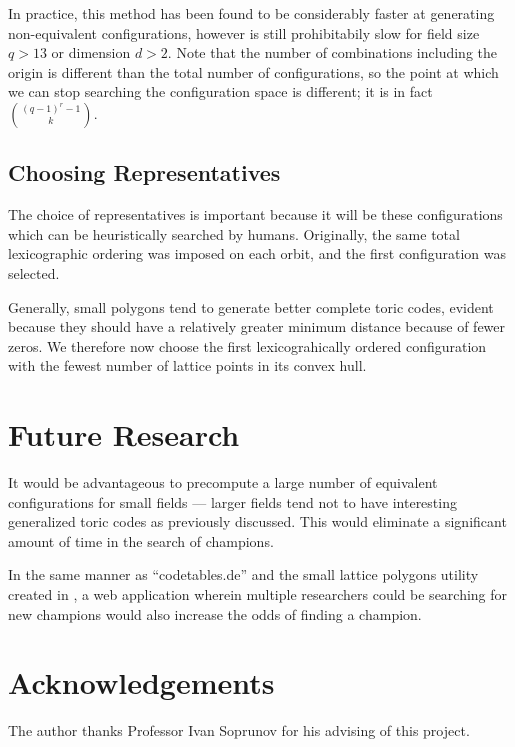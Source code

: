 \documentclass[12pt]{amsart}
\theoremstyle{plain}
\begin{document}
In practice, this method has been found to be considerably faster at generating non-equivalent configurations, however is still prohibitabily slow for field size $q>13$ or dimension $d>2$. Note that the number of combinations including the origin is different than the total number of configurations, so the point at which we can stop searching the configuration space is different; it is in fact ${(q-1)^r - 1 \choose k}$.

\subsection{Choosing Representatives}
The choice of representatives is important because it will be these configurations which can be heuristically searched by humans. Originally, the same total lexicographic ordering was imposed on each orbit, and the first configuration was selected.

Generally, small polygons tend to generate better complete toric codes, evident because they should have a relatively greater minimum distance because of fewer zeros. We therefore now choose the first lexicograhically ordered configuration with the fewest number of lattice points in its convex hull.

\section{Future Research}
It would be advantageous to precompute a large number of equivalent configurations for small fields --- larger fields tend not to have interesting generalized toric codes as previously discussed. This would eliminate a significant amount of time in the search of champions.

In the same manner as ``codetables.de'' and the small lattice polygons utility created in \cite{poly}, a web application wherein multiple researchers could be searching for new champions would also increase the odds of finding a champion.


\section{Acknowledgements}
The author thanks Professor Ivan Soprunov for his advising of this project.

{}

\end{document}
